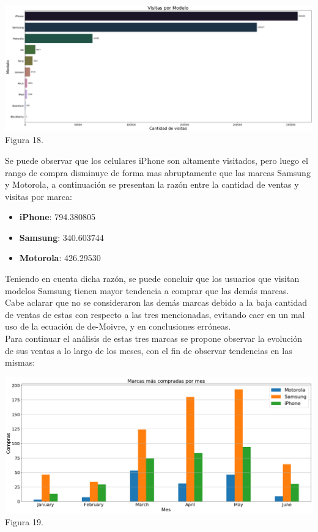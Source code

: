 \documentclass[a4paper ,12pt]{article}
\begin{document}
\begin{center}
	\includegraphics[width=1.1\linewidth]{output_65_0}
	Figura 18.
	
\end{center}

Se puede observar que los celulares iPhone son altamente visitados, pero luego el rango de compra disminuye de forma mas abruptamente que las marcas Samsung y Motorola, a continuación se presentan la razón entre la cantidad de ventas y visitas por marca:
\begin{itemize}
	\item \textbf{iPhone}: 794.380805
	\item \textbf{Samsung}: 340.603744
	\item \textbf{Motorola}: 426.29530 
\end{itemize}

Teniendo en cuenta dicha razón, se puede concluir que los usuarios que visitan modelos Samsung tienen mayor tendencia a comprar que las demás marcas.\\


Cabe aclarar que no se consideraron las demás marcas debido a la baja cantidad de ventas de estas con respecto a las tres mencionadas, evitando caer en un mal uso de la ecuación de de-Moivre, y en conclusiones erróneas. 
\\


Para continuar el análisis de estas tres marcas se propone observar la evolución de sus ventas a lo largo de los meses, con el fin de observar tendencias en las mismas:\\

\begin{center}
	\includegraphics[width=1.1\linewidth]{output_67_0}
	Figura 19.
	
\end{center}
\end{document}
